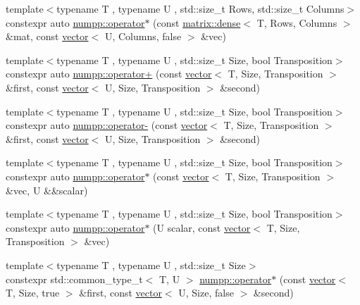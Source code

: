 \begin{DoxyCompactItemize}
\item 
{\footnotesize template$<$typename T , typename U , std\+::size\+\_\+t Rows, std\+::size\+\_\+t Columns$>$ }\\constexpr auto \hyperlink{group__numpp__structures__vector_ga631ef12f529e5fc50704b55b8fa8b6df}{numpp\+::operator$\ast$} (const \hyperlink{classnumpp_1_1matrix_1_1dense}{matrix\+::dense}$<$ T, Rows, Columns $>$ \&mat, const \hyperlink{classnumpp_1_1vector}{vector}$<$ U, Columns, false $>$ \&vec)
\item 
{\footnotesize template$<$typename T , typename U , std\+::size\+\_\+t Size, bool Transposition$>$ }\\constexpr auto \hyperlink{group__numpp__structures__vector_ga3942b8e2790d5d9b328632be6cf4aeb4}{numpp\+::operator+} (const \hyperlink{classnumpp_1_1vector}{vector}$<$ T, Size, Transposition $>$ \&first, const \hyperlink{classnumpp_1_1vector}{vector}$<$ U, Size, Transposition $>$ \&second)
\item 
{\footnotesize template$<$typename T , typename U , std\+::size\+\_\+t Size, bool Transposition$>$ }\\constexpr auto \hyperlink{group__numpp__structures__vector_gaed4254f0627625649e3db732b6ff7f76}{numpp\+::operator-\/} (const \hyperlink{classnumpp_1_1vector}{vector}$<$ T, Size, Transposition $>$ \&first, const \hyperlink{classnumpp_1_1vector}{vector}$<$ U, Size, Transposition $>$ \&second)
\item 
{\footnotesize template$<$typename T , typename U , std\+::size\+\_\+t Size, bool Transposition$>$ }\\constexpr auto \hyperlink{group__numpp__structures__vector_gab6aeead62bc88777e4664a8eadfa7720}{numpp\+::operator$\ast$} (const \hyperlink{classnumpp_1_1vector}{vector}$<$ T, Size, Transposition $>$ \&vec, U \&\&scalar)
\item 
{\footnotesize template$<$typename T , typename U , std\+::size\+\_\+t Size, bool Transposition$>$ }\\constexpr auto \hyperlink{group__numpp__structures__vector_gae2786c050a7f51f3f0c9d23e2093de91}{numpp\+::operator$\ast$} (U scalar, const \hyperlink{classnumpp_1_1vector}{vector}$<$ T, Size, Transposition $>$ \&vec)
\item 
{\footnotesize template$<$typename T , typename U , std\+::size\+\_\+t Size$>$ }\\constexpr std\+::common\+\_\+type\+\_\+t$<$ T, U $>$ \hyperlink{group__numpp__structures__vector_ga8d85eefc2eadd9008013c43e7e90f65f}{numpp\+::operator$\ast$} (const \hyperlink{classnumpp_1_1vector}{vector}$<$ T, Size, true $>$ \&first, const \hyperlink{classnumpp_1_1vector}{vector}$<$ U, Size, false $>$ \&second)

\end{DoxyCompactItemize}
